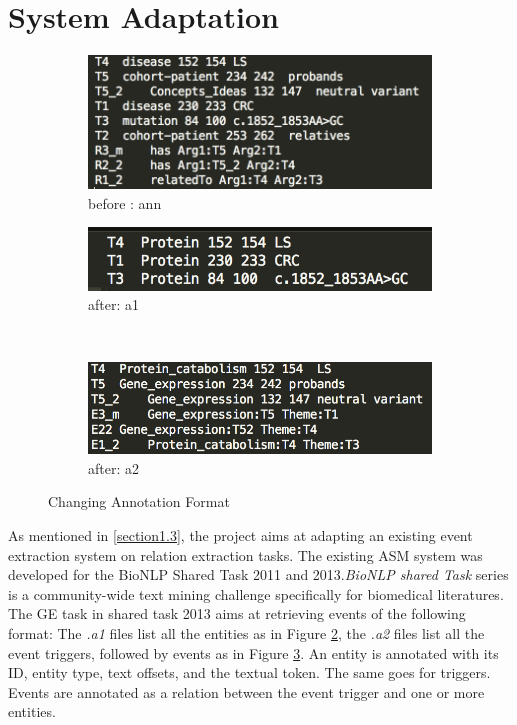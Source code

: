 \section{System Adaptation}
\begin{figure}[h]
	\centering
	\begin{subfigure}[b]{0.3\textwidth}
		\includegraphics[width=\textwidth]{ann}
		\caption{before	: ann}
		\label{fig:ann}
	\end{subfigure}             
	\vfill
	\begin{subfigure}[b]{0.3\textwidth}
		\includegraphics[width=\textwidth]{a1}
		\caption{after: a1}
		\label{fig:a1}   
	\end{subfigure}
	~
	\begin{subfigure}[b]{0.3\textwidth}
		\includegraphics[width=\textwidth]{a2}
		\caption{after: a2}
		\label{fig:a2}   
	\end{subfigure}  
	\caption{Changing Annotation Format}
	\label{fig:annotation_format}
\end{figure}
As mentioned in \ref{section1.3}, the project aims at adapting an existing event extraction system on relation extraction tasks. The existing ASM system was developed for the BioNLP Shared Task 2011 and 2013.\newline\newline \emph{BioNLP shared Task} series is a community-wide text mining challenge specifically for biomedical literatures. The GE task in shared task 2013 aims at retrieving events of the following format: The \emph{.a1} files list all the entities as in Figure \ref{fig:a1}, the \emph{.a2} files list all the event triggers, followed by events as in Figure \ref{fig:a2}. An entity is annotated with its ID, entity type, text offsets, and the textual token. The same goes for triggers. Events are annotated as a relation between the event trigger and one or more entities.\newline\newline
